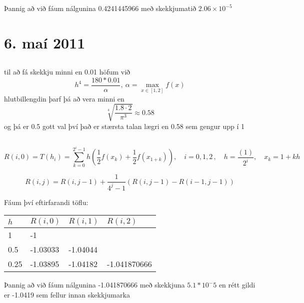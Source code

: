 \documentclass[10pt,a4paper]{article}
\begin{document}
Þannig að við fáum nálgunina 0.4241445966 með skekkjumatið $2.06 \times 10^{-5}$

\setcounter{section}{8}

\section{6. maí 2011}
\subsection{}
til að fá skekkju minni en 0.01 höfum við $$h^4=\frac{180*0.01}{\alpha},\ \alpha = \max_{ x \in [1,2]}f(x) $$
hlutbillengdin þarf þá að vera minni en $$\sqrt[4]{\frac{1.8\cdot 2}{\pi^3}}\approx 0.58$$
og þá er 0.5 gott val því það er stærsta talan lægri en 0.58 sem gengur upp í 1 
\subsection{}
\[R(i,0)=T(h_i)=\sum_{k=0}^{2^i-1}h(\frac{1}{2}f(x_k) + \frac{1}{2}f(x_{1+k})),\quad i=0,1,2\, , \quad h=\frac{(1)}{2^i},\quad x_k =  1 + kh\]

\[
R(i,j)=R(i,j-1) + \frac{1}{4^j-1}(R(i,j-1)-R(i-1,j-1))
\]

Fáum því eftirfarandi töflu:

\begin{tabular}{l|lll}
$h$&$R(i,0)$&$R(i,1)$&$R(i,2)$\\ \hline
1	&-1\\
0.5	&-1.03033&-1.04044\\
0.25	&-1.03895&-1.04182&-1.041870666\\
\end{tabular}
Þannig að við fáum nálgunina -1.041870666 með skekkjuna $5.1*10^-5$ en rétt gildi er -1.0419 sem fellur innan skekkjumarka
\end{document}
